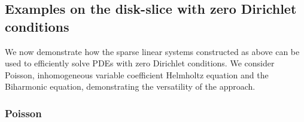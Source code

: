 \documentclass[11pt, oneside]{article}   	%
\begin{document}
%
\subsection{Examples on the disk-slice with zero Dirichlet conditions}\label{Section:Examples}

We now demonstrate how the sparse linear systems constructed as above can be used to efficiently solve PDEs with zero Dirichlet conditions. We consider Poisson, inhomogeneous variable coefficient Helmholtz equation and the Biharmonic equation, demonstrating the versatility of the approach. 

\subsubsection{Poisson}

\end{document}

